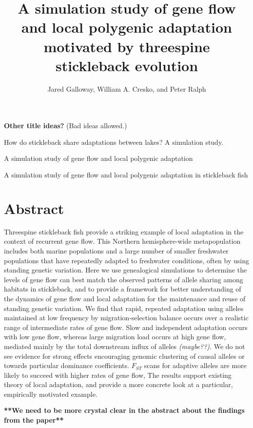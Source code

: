 \documentclass{article}
\begin{document}
\title{A simulation study of gene flow and local polygenic adaptation motivated by threespine stickleback evolution}
\author{Jared Galloway, William A. Cresko, and Peter Ralph}
\maketitle

\textbf{Other title ideas?} (Bad ideas allowed.)

How do stickleback share adaptations between lakes? A simulation study.

A simulation study of gene flow and local polygenic adaptation

A simulation study of gene flow and local polygenic adaptation in stickleback fish

\section*{Abstract}

Threespine stickleback fish provide a striking example of local adaptation in the context of recurrent gene flow. This Northern hemisphere-wide metapopulation includes both marine populations and a large number of smaller freshwater populations that have repeatedly adapted to freshwater conditions, often by using standing genetic variation. Here we use genealogical simulations to determine the levels of gene flow can best match the observed patterns of allele sharing among habitats in stickleback, and to provide a framework for better understanding of the dynamics of gene flow and local adaptation for the maintenance and reuse of standing genetic variation. We find that rapid, repeated adaptation using alleles maintained at low frequency by migration-selection balance occurs over a realistic range of intermediate rates of gene flow.  Slow and independent adaptation occurs with low gene flow, whereas large migration load occurs at high gene flow, mediated mainly by the total downstream influx of alleles \emph{(maybe??)}. We do not see evidence for strong effects encouraging genomic clustering of causal alleles or towards particular dominance coefficients. $F_{ST}$ scans for adaptive alleles are more likely to succeed with higher rates of gene flow, The results support existing theory of local adaptation, and provide a more concrete look at a particular, empirically motivated example.  

\textbf{**We need to be more crystal clear in the abstract about the findings from the paper**}
\end{document}
